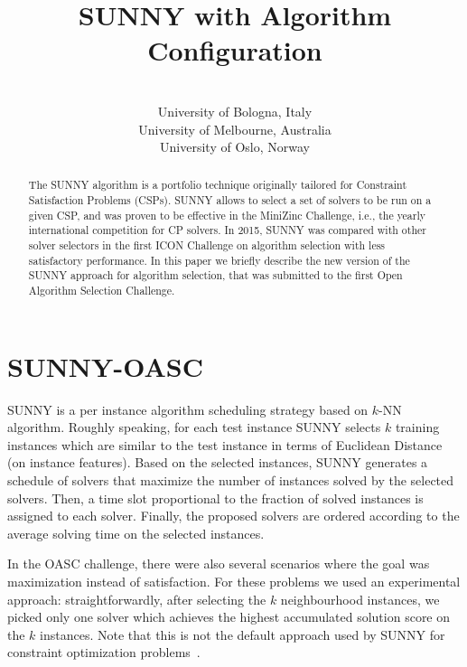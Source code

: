 \documentclass[tablecaption=bottom,wcp]{jmlr} %
\title[SUNNY-OASC]{SUNNY with Algorithm Configuration}
\author{\Name{Tong Liu} \Email{t.liu@unibo.it}\\
 \addr University of Bologna, Italy 
 \AND
 \Name{Roberto Amadini} \Email{roberto.amadini@unimelb.edu.au}\\
 \addr University of Melbourne, Australia
 \AND
 \Name{Jacopo Mauro} \Email{mauro.jacopo@gmail.com}\\
 \addr University of Oslo, Norway
 }
\begin{document}
\maketitle

\begin{abstract}%
The SUNNY algorithm is a portfolio technique originally tailored for 
Constraint Satisfaction Problems (CSPs). SUNNY allows to select a set of 
solvers to be run on a given CSP, and was proven to be effective in the 
MiniZinc Challenge, i.e., the yearly international competition 
for CP solvers. In 2015, SUNNY was compared with other solver selectors in the 
first ICON Challenge on algorithm selection with less satisfactory performance.
In this paper we briefly describe the new version of the SUNNY approach for 
algorithm selection, that was submitted to the first Open Algorithm 
Selection Challenge.
\end{abstract}


\section{SUNNY-OASC}


SUNNY is a per instance algorithm scheduling strategy based on $k$-NN algorithm.
Roughly speaking, for each test instance SUNNY selects
$k$ training instances which are similar to the test instance
in terms of Euclidean Distance (on instance features). Based on the selected instances,
SUNNY generates a schedule of solvers that maximize the number of
instances solved by the selected solvers. 
Then, a time slot proportional to the fraction of solved instances is
assigned to each solver. Finally, the proposed solvers are ordered
according to the average solving time on the selected instances.

In the OASC challenge, there were also several scenarios 
where the goal was maximization instead of satisfaction.
For these problems we used an experimental approach:
straightforwardly, after selecting the $k$ neighbourhood instances, 
we picked only one solver which achieves the highest accumulated solution score 
on the $k$ instances.
Note that this is not the default approach used by SUNNY for constraint 
optimization problems~\citep{sunnycp2,paper_amai}.
\end{document}
